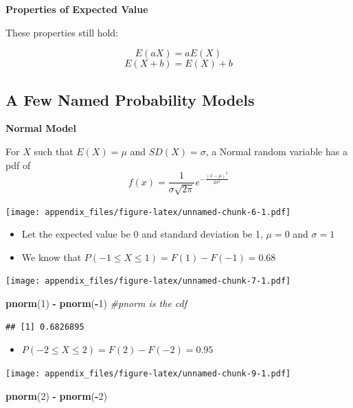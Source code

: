 \documentclass[
]{book}
\newenvironment{Shaded}{\begin{snugshade}}{\end{snugshade}}
\newcommand{\CommentTok}[1]{\textcolor[rgb]{0.56,0.35,0.01}{\textit{#1}}}
\newcommand{\DecValTok}[1]{\textcolor[rgb]{0.00,0.00,0.81}{#1}}
\newcommand{\KeywordTok}[1]{\textcolor[rgb]{0.13,0.29,0.53}{\textbf{#1}}}
\newcommand{\NormalTok}[1]{#1}
\newcommand{\OperatorTok}[1]{\textcolor[rgb]{0.81,0.36,0.00}{\textbf{#1}}}
\newcommand{\StringTok}[1]{\textcolor[rgb]{0.31,0.60,0.02}{#1}}
\providecommand{\tightlist}{%
  \setlength{\itemsep}{0pt}\setlength{\parskip}{0pt}}
\begin{document}
\textbf{Properties of Expected Value}

These properties still hold:

\[ E(aX) =  aE(X)\]
\[E(X+b) = E(X) + b\]

\hypertarget{a-few-named-probability-models-1}{%
\subsection{A Few Named Probability Models}\label{a-few-named-probability-models-1}}

\textbf{Normal Model}

For \(X\) such that \(E(X) = \mu\) and \(SD(X) = \sigma\), a Normal random variable has a pdf of
\[f(x) =  \frac{1}{\sigma\sqrt{2\pi}}e^{-\frac{(x-\mu)^2}{2\sigma^2}}\]

\texttt{[image: appendix\_files/figure-latex/unnamed-chunk-6-1.pdf]}

\begin{itemize}
\item
  Let the expected value be 0 and standard deviation be 1, \(\mu = 0\) and \(\sigma = 1\)
\item
  We know that \(P(-1\leq X \leq 1) = F(1) - F(-1) = 0.68\)
\end{itemize}

\texttt{[image: appendix\_files/figure-latex/unnamed-chunk-7-1.pdf]}

\begin{Shaded}
\begin{Highlighting}[]
\KeywordTok{pnorm}\NormalTok{(}\DecValTok{1}\NormalTok{) }\OperatorTok{-}\StringTok{ }\KeywordTok{pnorm}\NormalTok{(}\OperatorTok{-}\DecValTok{1}\NormalTok{) }\CommentTok{#pnorm is the cdf}
\end{Highlighting}
\end{Shaded}

\begin{verbatim}
## [1] 0.6826895
\end{verbatim}

\begin{itemize}
\tightlist
\item
  \(P(-2\leq X \leq 2) = F(2) - F(-2) = 0.95\)
\end{itemize}

\texttt{[image: appendix\_files/figure-latex/unnamed-chunk-9-1.pdf]}

\begin{Shaded}
\begin{Highlighting}[]
\KeywordTok{pnorm}\NormalTok{(}\DecValTok{2}\NormalTok{) }\OperatorTok{-}\StringTok{ }\KeywordTok{pnorm}\NormalTok{(}\OperatorTok{-}\DecValTok{2}\NormalTok{)}
\end{Highlighting}
\end{Shaded}
\end{document}
